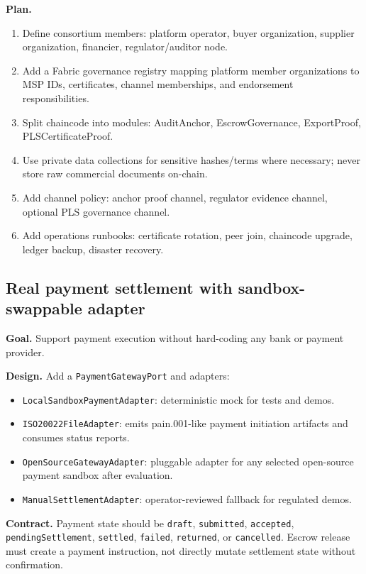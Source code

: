\documentclass[11pt]{article}
\newcommand{\code}[1]{\texttt{#1}}
\begin{document}
\textbf{Plan.}
\begin{enumerate}
  \item Define consortium members: platform operator, buyer organization, supplier organization, financier, regulator/auditor node.
  \item Add a Fabric governance registry mapping platform member organizations to MSP IDs, certificates, channel memberships, and endorsement responsibilities.
  \item Split chaincode into modules: AuditAnchor, EscrowGovernance, ExportProof, PLSCertificateProof.
  \item Use private data collections for sensitive hashes/terms where necessary; never store raw commercial documents on-chain.
  \item Add channel policy: anchor proof channel, regulator evidence channel, optional PLS governance channel.
  \item Add operations runbooks: certificate rotation, peer join, chaincode upgrade, ledger backup, disaster recovery.
\end{enumerate}

\subsection{Real payment settlement with sandbox-swappable adapter}
\textbf{Goal.} Support payment execution without hard-coding any bank or payment provider.

\textbf{Design.} Add a \code{PaymentGatewayPort} and adapters:
\begin{itemize}
  \item \code{LocalSandboxPaymentAdapter}: deterministic mock for tests and demos.
  \item \code{ISO20022FileAdapter}: emits pain.001-like payment initiation artifacts and consumes status reports.
  \item \code{OpenSourceGatewayAdapter}: pluggable adapter for any selected open-source payment sandbox after evaluation.
  \item \code{ManualSettlementAdapter}: operator-reviewed fallback for regulated demos.
\end{itemize}

\textbf{Contract.} Payment state should be \code{draft}, \code{submitted}, \code{accepted}, \code{pendingSettlement}, \code{settled}, \code{failed}, \code{returned}, or \code{cancelled}. Escrow release must create a payment instruction, not directly mutate settlement state without confirmation.
\end{document}
